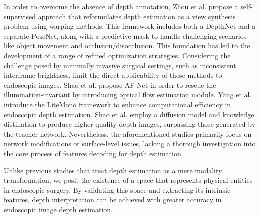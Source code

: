 In order to overcome the absence of depth annotation, Zhou et al. \cite{rw_dl_1} propose a self-supervised approach that reformulates depth estimation as a view synthesis problem using warping methods. This framework includes both a DepthNet and a separate PoseNet, along with a predictive mask to handle challenging scenarios like object movement and occlusion/disocclusion. This foundation has led to the development of a range of refined optimization strategies\cite{rw_dl_2,rw_dl_3,rw_dl_4,rw_dl_5,rw_dl_6,rw_dl_7}.  Considering the challenge posed by minimally invasive surgical settings, such as inconsistent interframe brightness, limit the direct applicability of these methods to endoscopic images. Shao et al. \cite{bright} propose AF-Net in order to rescue the illumination-invariant by introducing optical flow estimation module. Yang et al. \cite{rw_dl_8} introduce the LiteMono framework to enhance computational efficiency in endoscopic depth estimation. Shao et al. \cite{rw_dl_9} employ a diffusion model and knowledge distillation to produce higher-quality depth images, surpassing those generated by the teacher network. Nevertheless, the aforementioned studies primarily focus on network modifications or surface-level issues, lacking a thorough investigation into the core process of features decoding for depth estimation.\par 

Unlike previous studies that treat depth estimation as a mere modality transformation, we posit the existence of a space that represents physical entities in endoscopic surgery. By validating this space and extracting its intrinsic features, depth interpretation can be achieved with greater accuracy in endoscopic image depth estimation.\par